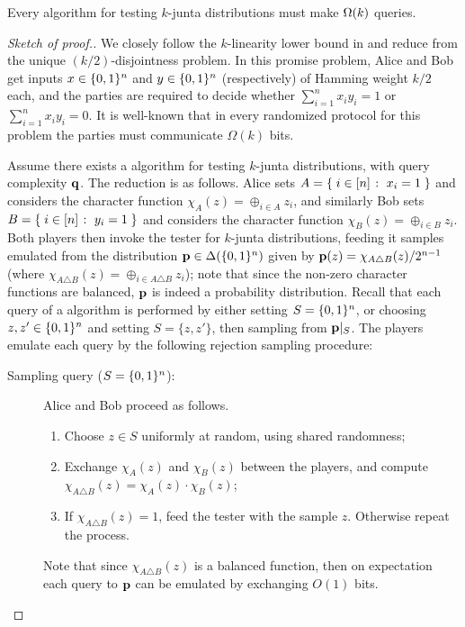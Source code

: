 \begin{theorem}
	Every \PCOND algorithm for testing $k$-junta distributions must make $\bigOmega{k}$ queries.	
\end{theorem}

\begin{proof}[Sketch of proof.]
We closely follow the $k$-linearity lower bound in \cite{BBM:12} and reduce from the unique $(k/2)$-disjointness problem. In this promise problem, Alice and Bob get inputs $x\in\{0,1\}^n$ and $y\in\{0,1\}^n$ (respectively) of Hamming weight $k/2$ each, and the parties are required to decide whether $\sum_{i =1}^n x_i y_i = 1$ or $\sum_{i =1}^n x_i y_i = 0$. It is well-known that in every randomized protocol for this problem the parties must communicate $\Omega(k)$ bits.

Assume there exists a \PCOND algorithm for testing $k$-junta distributions, with query complexity $\mathbf{q}$. The reduction is as follows. Alice sets $A = \left\{\; i\in[n] \;\colon\; x_i = 1\; \right\}$ and considers the character function $\chi_A(z) = \oplus_{i \in A} z_i$, and similarly Bob sets $B = \left\{\; i\in[n] \;\colon\; y_i = 1\; \right\}$ and considers the character function $\chi_B(z) = \oplus_{i \in B} z_i$. Both players then invoke the tester for $k$-junta distributions, feeding it samples emulated from the distribution $\mathbf{p} \in\Delta\!\left(\{0,1\}^n\right)$ given by $\mathbf{p}(z) = \chi_{A \triangle B}(z)/2^{n-1}$ (where $\chi_{A \triangle B}(z) = \oplus_{i \in A \triangle B} z_i$); note that since the non-zero character functions are balanced, $\mathbf{p}$ is indeed a probability distribution. Recall that each query of a \PCOND algorithm is performed by either setting $S = \{0,1\}^n$, or choosing $z,z'\in\{0,1\}^n$ and setting $S = \{z,z'\}$, then sampling from $\mathbf{p}|_S$. The players emulate each \PCOND query by the following rejection sampling procedure: 

\begin{description}
\item[Sampling query ($S=\{0,1\}^n$):] Alice and Bob proceed as follows.
  \begin{enumerate}
	  \item Choose $z \in S$ uniformly at random, using shared randomness;
	  \item Exchange $\chi_A(z)$ and $\chi_B(z)$ between the players, and compute $\chi_{A \triangle B}(z) = \chi_A(z) \cdot \chi_B(z)$;
	  \item If $\chi_{A \triangle B}(z) = 1$, feed the tester with the sample $z$. Otherwise repeat the process.
  \end{enumerate}
Note that since $\chi_{A \triangle B}(z)$ is a balanced function, then on expectation each \PCOND query to $\mathbf{p}$ can be emulated by exchanging $O(1)$ bits.


\end{description}
\end{proof}
